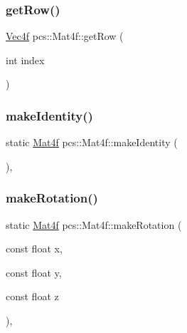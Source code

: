 \subsubsection{\texorpdfstring{get\+Row()}{getRow()}}
{\footnotesize\ttfamily \hyperlink{namespacepcs_a826b4146f438aa3a4c6a5c157bc8dea2}{Vec4f} pcs\+::\+Mat4f\+::get\+Row (\begin{DoxyParamCaption}\item[{int}]{index }\end{DoxyParamCaption})\hspace{0.3cm}{\ttfamily [inline]}}

\mbox{\label{structpcs_1_1Mat4f_a3c7026479b0855ee1e1a4ff962872a95}} 
\subsubsection{\texorpdfstring{make\+Identity()}{makeIdentity()}}
{\footnotesize\ttfamily static \hyperlink{structpcs_1_1Mat4f}{Mat4f} pcs\+::\+Mat4f\+::make\+Identity (\begin{DoxyParamCaption}{ }\end{DoxyParamCaption})\hspace{0.3cm}{\ttfamily [inline]}, {\ttfamily [static]}}

\mbox{\label{structpcs_1_1Mat4f_a0bacf80f2ce6f50ad379299010a7cc44}} 
\subsubsection{\texorpdfstring{make\+Rotation()}{makeRotation()}\hspace{0.1cm}{\footnotesize\ttfamily [1/2]}}
{\footnotesize\ttfamily static \hyperlink{structpcs_1_1Mat4f}{Mat4f} pcs\+::\+Mat4f\+::make\+Rotation (\begin{DoxyParamCaption}\item[{const float}]{x,  }\item[{const float}]{y,  }\item[{const float}]{z }\end{DoxyParamCaption})\hspace{0.3cm}{\ttfamily [inline]}, {\ttfamily [static]}}

